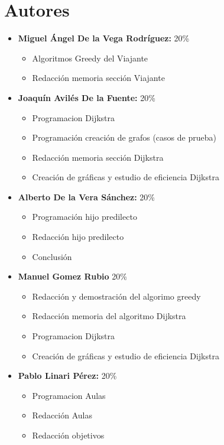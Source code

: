\documentclass[11pt,openany]{book}
\begin{document}
\tableofcontents %
\newpage %


\chapter{Autores}
\begin{itemize}
      \item \textbf{Miguel Ángel De la Vega Rodríguez:} 20\%
            \begin{itemize}
                  \item Algoritmos Greedy del Viajante
                  \item Redacción memoria sección Viajante
            \end{itemize}
      \item \textbf{Joaquín Avilés De la Fuente:} 20\%
            \begin{itemize}
                  \item Programacion Dijkstra
                  \item Programación creación de grafos (casos de prueba)
                  \item Redacción memoria sección Dijkstra
                  \item Creación de gráficas y estudio de eficiencia Dijkstra
            \end{itemize}
      \item \textbf{Alberto De la Vera Sánchez: } 20\%
            \begin{itemize}
                  \item Programación hijo predilecto
                  \item Redacción hijo predilecto
                  \item Conclusión
            \end{itemize}
      \item \textbf{Manuel Gomez Rubio} 20\%
            \begin{itemize}
                  \item Redacción y demostración del algorimo greedy
                  \item Redacción memoria del algoritmo Dijkstra
                  \item Programacion Dijkstra
                  \item Creación de gráficas y estudio de eficiencia Dijkstra
            \end{itemize}
      \item \textbf{Pablo Linari Pérez:} 20\%
            \begin{itemize}
                  \item Programacion Aulas
                  \item Redacción Aulas
                  \item Redacción objetivos
            \end{itemize}
\end{itemize}
\end{document}
